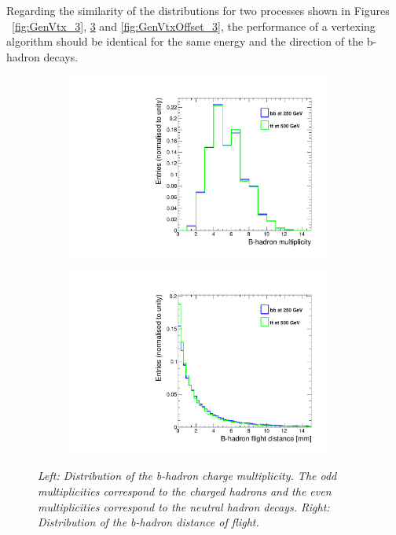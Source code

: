 Regarding the similarity of the distributions for two processes shown in Figures ~\ref{fig:GenVtx_3}, \ref{fig:GenHadronParams_3} and \ref{fig:GenVtxOffset_3}, the performance of a vertexing algorithm should be identical for the same energy and the direction of the b-hadron decays.


\begin{figure}[h]
\centering
\begin{subfigure}{0.5\textwidth}
    \includegraphics[width=0.95\textwidth]{ILD/plots/gen-hadron-multiplicity.pdf}
\caption{\label{fig:GenHadronParams_a_3} }
\end{subfigure}%
  \begin{subfigure}{0.5\textwidth}
\centering
    \includegraphics[width=0.95\textwidth]{ILD/plots/gen-hadron-distance.pdf}
\caption{\label{fig:GenHadronParams_b_3} }
\end{subfigure}
    \caption{\sl Left: Distribution of the b-hadron charge multiplicity. The odd multiplicities correspond to the charged hadrons and the even multiplicities correspond to the neutral hadron decays.   Right: Distribution of the b-hadron distance of flight. }
    \label{fig:GenHadronParams_3}
\end{figure}

